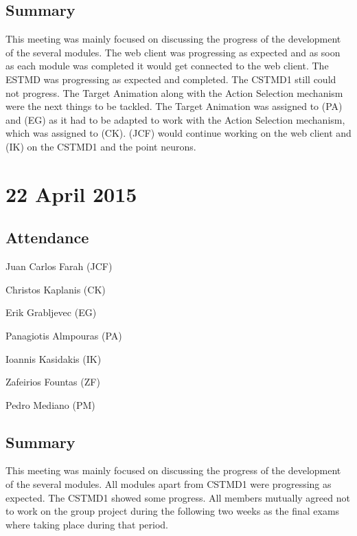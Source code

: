 \documentclass[a4paper,11pt]{article}
\begin{document}
\subsection*{Summary}
This meeting was mainly focused on discussing the progress of the development of the several modules. The web client was progressing as expected and as soon as each module was completed it would get connected to the web client. The ESTMD was progressing as expected and completed. The CSTMD1 still could not progress. The Target Animation along with the Action Selection mechanism were the next things to be tackled. The Target Animation was assigned to (PA) and (EG) as it had to be adapted to work with the Action Selection mechanism, which was assigned to (CK). (JCF) would continue working on the web client and (IK) on the CSTMD1 and the point neurons.

\maketitle
\section*{22 April 2015}
\subsection*{Attendance}
\begin{compactenum}
\item Juan Carlos Farah (JCF)
\item Christos Kaplanis (CK)
\item Erik Grabljevec (EG)
\item Panagiotis Almpouras (PA)
\item Ioannis Kasidakis (IK)
\item Zafeirios Fountas (ZF)
\item Pedro Mediano (PM)
\end{compactenum}

\subsection*{Summary}
This meeting was mainly focused on discussing the progress of the development of the several modules. All modules apart from CSTMD1 were progressing as expected. The CSTMD1 showed some progress. All members mutually agreed not to work on the group project during the following two weeks as the final exams where taking place during that period.
\end{document}
